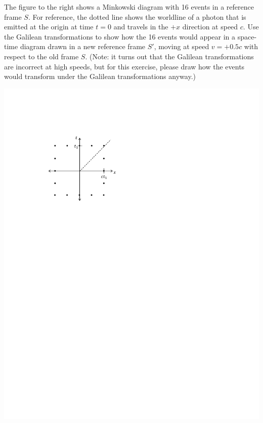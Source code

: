 \begin{minipage}{0.65 \textwidth}
\begin{Exercise}[difficulty=1]
The figure to the right shows a Minkowski diagram with 16 events in a reference frame $S$.  For reference, the dotted line shows the worldline of a photon that is emitted at the origin at time $t=0$ and travels in the $+x$ direction at speed $c$.  Use the Galilean transformations to show how the 16 events would appear in a space-time diagram drawn in a new reference frame $S'$, moving at speed $v=+0.5c$ with respect to the old frame $S$.  (Note: it turns out that the Galilean transformations are incorrect at high speeds, but for this exercise, please draw how the events would transform under the Galilean transformations anyway.)
\end{Exercise}
\end{minipage}
\begin{minipage}{0.34 \textwidth}
\hspace{\fill}\includegraphics[scale=0.8]{M_problems/galilean_relativity/16_points.pdf}
\end{minipage}



